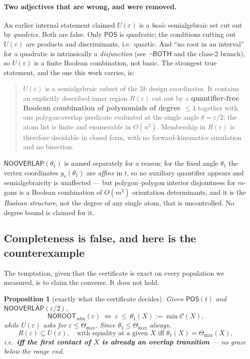 \documentclass[11pt,a4paper]{article}
\newtheorem{proposition}[theorem]{Proposition}
\theoremstyle{definition}
\newcommand{\Tmax}{\Theta_{\max}}
\newcommand{\POS}{\textsf{POS}}
\newcommand{\NOOV}{\textsf{NOOVERLAP}}
\newcommand{\NOROOT}{\textsf{NOROOT}}
\begin{document}
\paragraph{Two adjectives that are wrong, and were removed.} An earlier internal statement
claimed $U(\varepsilon)$ is a \emph{basic} semialgebraic set cut out by \emph{quadrics}. Both
are false. Only $\POS$ is quadratic; the conditions cutting out $U(\varepsilon)$ are products
and discriminants, i.e.\ quartic. And ``no root in an interval'' for a quadratic is
intrinsically a \emph{disjunction} (see $\neg\textsf{BOTH}$ and the class-2 branch), so
$U(\varepsilon)$ is a finite Boolean combination, not basic. The strongest true statement,
and the one this work carries, is:

\begin{quote}
$U(\varepsilon)$ is a semialgebraic subset of the $2k$ design coordinates. It contains an
explicitly described inner region $R(\varepsilon)$ cut out by a \textbf{quantifier-free
Boolean combination of polynomials of degree $\le4$} together with one polygon-overlap
predicate evaluated at the single angle $\theta=\varepsilon/2$; the atom list is finite and
enumerable in $O(n^2)$. Membership in $R(\varepsilon)$ is therefore decidable in closed form,
with no forward-kinematics simulation and no bisection.
\end{quote}

\noindent $\NOOV(\theta_1)$ is named separately for a reason: for the fixed angle $\theta_1$
the vertex coordinates $y_v(\theta_1)$ are \emph{affine} in $t$, so no auxiliary quantifier
appears and semialgebraicity is unaffected --- but polygon--polygon interior disjointness for
$m$-gons is a Boolean combination of $O(m^2)$ orientation determinants, and it is the
\emph{Boolean structure}, not the degree of any single atom, that is uncontrolled. No degree
bound is claimed for it.

\subsection{Completeness is false, and here is the counterexample}

The temptation, given that the certificate is exact on every population we measured, is to
claim the converse. It does not hold.

\begin{proposition}[exactly what the certificate decides]
\label{prop:notcomplete}
Given $\POS(t)$ and $\NOOV(\varepsilon/2)$,
\[
\NOROOT_{\mathrm{adm}}(\varepsilon)\;\Longleftrightarrow\;
\varepsilon\ \le\ \theta_1(X):=\min\mathcal{C}(X),
\]
while $U(\varepsilon)$ asks for $\varepsilon\le\Tmax$. Since $\theta_1\le\Tmax$ always,
\[
R(\varepsilon)\subseteq U(\varepsilon),\quad\text{with equality at a given }X
\text{ iff } \theta_1(X)=\Tmax(X),
\]
i.e.\ \textbf{iff the first contact of $X$ is already an overlap transition} --- no graze
below the range end.
\end{proposition}
\end{document}
